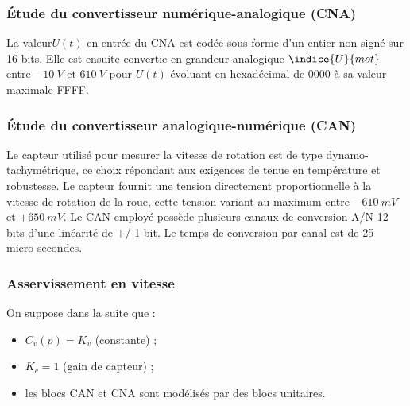 
\subsubsection{Étude du convertisseur numérique-analogique (CNA)}

La valeur$U (t)$ en entrée du CNA est codée sous forme d'un entier non signé sur 16 bits. Elle est
ensuite convertie en grandeur analogique $\indice{U}{mot}$ entre $-\SI{10}{V}$ et $6\SI{10}{V}$ pour $U (t)$ évoluant en
hexadécimal de 0000 à sa valeur maximale FFFF.


\subsubsection{Étude du convertisseur analogique-numérique (CAN)}

Le capteur utilisé pour mesurer la vitesse de rotation est de type dynamo-tachymétrique, ce choix
répondant aux exigences de tenue en température et robustesse. Le capteur fournit une tension
directement proportionnelle à la vitesse de rotation de la roue, cette tension variant au maximum
entre $-\SI{610}{mV}$ et $+\SI{650}{mV}$. Le CAN employé possède plusieurs canaux de conversion A/N 12 bits
d'une linéarité de +/-1 bit. Le temps de conversion par canal est de 25 micro-secondes.




\subsubsection{Asservissement en vitesse}

On suppose dans la suite que :
\begin{itemize}
\item $C_v ( p)=K_v$ (constante) ;
\item $K_c =1$ (gain de capteur) ;
\item  les blocs CAN et CNA sont modélisés par des blocs unitaires.
\end{itemize}

